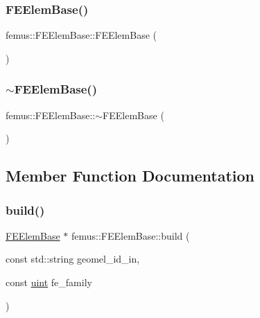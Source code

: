 \subsubsection{\texorpdfstring{F\+E\+Elem\+Base()}{FEElemBase()}}
{\footnotesize\ttfamily femus\+::\+F\+E\+Elem\+Base\+::\+F\+E\+Elem\+Base (\begin{DoxyParamCaption}{ }\end{DoxyParamCaption})}

\mbox{\label{classfemus_1_1_f_e_elem_base_a4aca64e8a81acb283c738ca123841ed3}} 
\subsubsection{\texorpdfstring{$\sim$\+F\+E\+Elem\+Base()}{~FEElemBase()}}
{\footnotesize\ttfamily femus\+::\+F\+E\+Elem\+Base\+::$\sim$\+F\+E\+Elem\+Base (\begin{DoxyParamCaption}{ }\end{DoxyParamCaption})\hspace{0.3cm}{\ttfamily [virtual]}}



\subsection{Member Function Documentation}
\mbox{\label{classfemus_1_1_f_e_elem_base_a012272423d14a7a4e399d26ca27cdcfc}} 
\subsubsection{\texorpdfstring{build()}{build()}}
{\footnotesize\ttfamily \mbox{\hyperlink{classfemus_1_1_f_e_elem_base}{F\+E\+Elem\+Base}} $\ast$ femus\+::\+F\+E\+Elem\+Base\+::build (\begin{DoxyParamCaption}\item[{const std\+::string}]{geomel\+\_\+id\+\_\+in,  }\item[{const \mbox{\hyperlink{_typedefs_8hpp_a91ad9478d81a7aaf2593e8d9c3d06a14}{uint}}}]{fe\+\_\+family }\end{DoxyParamCaption})\hspace{0.3cm}{\ttfamily [static]}}

